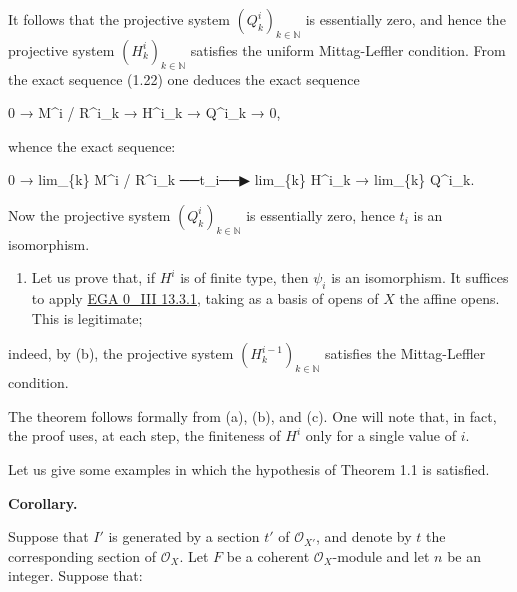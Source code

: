 \documentclass[
  11pt,
  a4paper,
]{book}
\newenvironment{Shaded}{}{}
\newcommand{\NormalTok}[1]{#1}
\providecommand{\tightlist}{%
  \setlength{\itemsep}{0pt}\setlength{\parskip}{0pt}}
\begin{document}
It follows that the projective system \((Q^{i}_{k})_{k \in \mathbb{N}}\)
is essentially zero, and hence the projective system
\((H^{i}_{k})_{k \in \mathbb{N}}\) satisfies the uniform Mittag-Leffler
condition. From the exact sequence (1.22) one deduces the exact sequence

\begin{Shaded}
\begin{Highlighting}[]
\NormalTok{0 → M\^{}i / R\^{}i\_k → H\^{}i\_k → Q\^{}i\_k → 0,}
\end{Highlighting}
\end{Shaded}

whence the exact sequence:

\begin{Shaded}
\begin{Highlighting}[]
\NormalTok{0 → lim\_\{k\} M\^{}i / R\^{}i\_k  ──t\_i──▶  lim\_\{k\} H\^{}i\_k → lim\_\{k\} Q\^{}i\_k.}
\end{Highlighting}
\end{Shaded}

Now the projective system \((Q^{i}_{k})_{k \in \mathbb{N}}\) is
essentially zero, hence \(t_{i}\) is an isomorphism.

\begin{enumerate}
\def\labelenumi{(\alph{enumi})}
\setcounter{enumi}{2}
\tightlist
\item
  Let us prove that, if \(H^{i}\) is of finite type, then \(\psi_{i}\)
  is an isomorphism. It suffices to apply
  \href{https://jcreinhold.github.io/ega/iii/06-ch0-13-projective-limits-homological-algebra.html\#133-application-cohomology-of-a-projective-limit-of-sheaves}{EGA
  0\_III 13.3.1}, taking as a basis of opens of \(X\) the affine opens.
  This is legitimate;
\end{enumerate}

indeed, by (b), the projective system
\((H^{i-1}_{k})_{k \in \mathbb{N}}\) satisfies the Mittag-Leffler
condition.

The theorem follows formally from (a), (b), and (c). One will note that,
in fact, the proof uses, at each step, the finiteness of \(H^{i}\) only
for a single value of \(i\).

Let us give some examples in which the hypothesis of Theorem 1.1 is
satisfied.

\textbf{Corollary.}

Suppose that \(I'\) is generated by a section \(t'\) of
\(\mathcal{O}_{X'}\), and denote by \(t\) the corresponding section of
\(\mathcal{O}_{X}\). Let \(F\) be a coherent \(\mathcal{O}_{X}\)-module
and let \(n\) be an integer. Suppose that:
\end{document}
